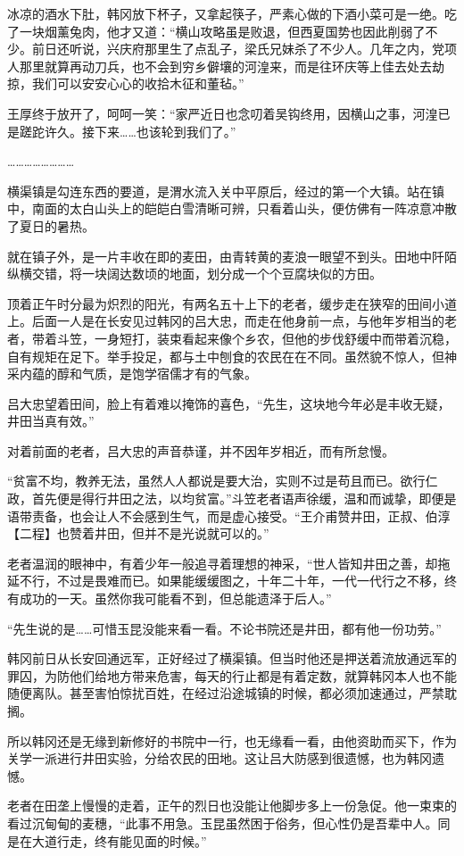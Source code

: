 冰凉的酒水下肚，韩冈放下杯子，又拿起筷子，严素心做的下酒小菜可是一绝。吃了一块烟薰兔肉，他才又道：“横山攻略虽是败退，但西夏国势也因此削弱了不少。前日还听说，兴庆府那里生了点乱子，梁氏兄妹杀了不少人。几年之内，党项人那里就算再动刀兵，也不会到穷乡僻壤的河湟来，而是往环庆等上佳去处去劫掠，我们可以安安心心的收拾木征和董毡。”

王厚终于放开了，呵呵一笑：“家严近日也念叨着吴钩终用，因横山之事，河湟已是蹉跎许久。接下来……也该轮到我们了。”

……………………

横渠镇是勾连东西的要道，是渭水流入关中平原后，经过的第一个大镇。站在镇中，南面的太白山头上的皑皑白雪清晰可辨，只看着山头，便仿佛有一阵凉意冲散了夏日的暑热。

就在镇子外，是一片丰收在即的麦田，由青转黄的麦浪一眼望不到头。田地中阡陌纵横交错，将一块阔达数顷的地面，划分成一个个豆腐块似的方田。

顶着正午时分最为炽烈的阳光，有两名五十上下的老者，缓步走在狭窄的田间小道上。后面一人是在长安见过韩冈的吕大忠，而走在他身前一点，与他年岁相当的老者，带着斗笠，一身短打，装束看起来像个乡农，但他的步伐舒缓中而带着沉稳，自有规矩在足下。举手投足，都与土中刨食的农民在在不同。虽然貌不惊人，但神采内蕴的醇和气质，是饱学宿儒才有的气象。

吕大忠望着田间，脸上有着难以掩饰的喜色，“先生，这块地今年必是丰收无疑，井田当真有效。”

对着前面的老者，吕大忠的声音恭谨，并不因年岁相近，而有所怠慢。

“贫富不均，教养无法，虽然人人都说是要大治，实则不过是苟且而已。欲行仁政，首先便是得行井田之法，以均贫富。”斗笠老者语声徐缓，温和而诚挚，即便是语带责备，也会让人不会感到生气，而是虚心接受。“王介甫赞井田，正叔、伯淳【二程】也赞着井田，但并不是光说就可以的。”

老者温润的眼神中，有着少年一般追寻着理想的神采，“世人皆知井田之善，却拖延不行，不过是畏难而已。如果能缓缓图之，十年二十年，一代一代行之不移，终有成功的一天。虽然你我可能看不到，但总能遗泽于后人。”

“先生说的是……可惜玉昆没能来看一看。不论书院还是井田，都有他一份功劳。”

韩冈前日从长安回通远军，正好经过了横渠镇。但当时他还是押送着流放通远军的罪囚，为防他们给地方带来危害，每天的行止都是有着定数，就算韩冈本人也不能随便离队。甚至害怕惊扰百姓，在经过沿途城镇的时候，都必须加速通过，严禁耽搁。

所以韩冈还是无缘到新修好的书院中一行，也无缘看一看，由他资助而买下，作为关学一派进行井田实验，分给农民的田地。这让吕大防感到很遗憾，也为韩冈遗憾。

老者在田垄上慢慢的走着，正午的烈日也没能让他脚步多上一份急促。他一束束的看过沉甸甸的麦穗，“此事不用急。玉昆虽然困于俗务，但心性仍是吾辈中人。同是在大道行走，终有能见面的时候。”

